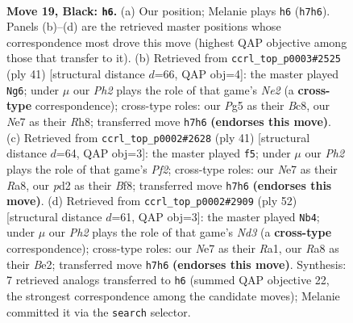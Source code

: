 \documentclass[11pt]{article}
\begin{document}
\clearpage

\begin{figure}[p]\centering
\begin{subfigure}{0.46\textwidth}\centering
\resizebox{\linewidth}{!}{%
\newchessgame
\chessboard[
  setfen={r1b3k1/ppppn2p/8/5pp1/8/1PN2P2/P1PPB1PP/R5K1 b - - 1 19},
  showmover=false,
  pgfstyle=straightmove, color=movearrow, markmove={h7-h6}
]}
\caption{}
\end{subfigure}\hfill
\begin{subfigure}{0.46\textwidth}\centering
\resizebox{\linewidth}{!}{%
\newchessgame
\chessboard[
  setfen={2b1k2r/ppp1np2/2p4p/4P3/7P/2N2N2/PPPR2P1/6K1 b - - 0 21},
  showmover=false,
  pgfstyle=straightmove, color=movearrow, markmove={e7-g6}
]}
\caption{}
\end{subfigure}
\\[4pt]
\begin{subfigure}{0.46\textwidth}\centering
\resizebox{\linewidth}{!}{%
\newchessgame
\chessboard[
  setfen={r3kb2/p1p2p2/1n4p1/2p4p/4N3/2B1P1P1/PP2KP1P/R7 b q - 0 21},
  showmover=false,
  pgfstyle=straightmove, color=movearrow, markmove={f7-f5}
]}
\caption{}
\end{subfigure}\hfill
\begin{subfigure}{0.46\textwidth}\centering
\resizebox{\linewidth}{!}{%
\newchessgame
\chessboard[
  setfen={1n2b3/1pr1kpp1/p3p2p/P7/2P5/1P1N1PP1/4B1P1/R5K1 w - - 3 27},
  showmover=false,
  pgfstyle=straightmove, color=movearrow, markmove={d3-b4}
]}
\caption{}
\end{subfigure}
\caption{\textbf{Move 19, Black: \texttt{h6}.} (a) Our position; Melanie plays \texttt{h6} (\texttt{h7h6}). Panels (b)--(d) are the retrieved master positions whose correspondence most drove this move (highest QAP objective among those that transfer to it). (b) Retrieved from \texttt{ccrl\_top\_p0003\#2525} (ply 41) [structural distance $d$=66, QAP obj=4]: the master played \texttt{Ng6}; under $\mu$ our \emph{Ph2} plays the role of that game's \emph{Ne2} (a \textbf{cross-type} correspondence); cross-type roles: our \emph{P}g5 as their \emph{B}c8, our \emph{N}e7 as their \emph{R}h8; transferred move \texttt{h7h6} \textbf{(endorses this move)}. (c) Retrieved from \texttt{ccrl\_top\_p0002\#2628} (ply 41) [structural distance $d$=64, QAP obj=3]: the master played \texttt{f5}; under $\mu$ our \emph{Ph2} plays the role of that game's \emph{Pf2}; cross-type roles: our \emph{N}e7 as their \emph{R}a8, our \emph{p}d2 as their \emph{B}f8; transferred move \texttt{h7h6} \textbf{(endorses this move)}. (d) Retrieved from \texttt{ccrl\_top\_p0002\#2909} (ply 52) [structural distance $d$=61, QAP obj=3]: the master played \texttt{Nb4}; under $\mu$ our \emph{Ph2} plays the role of that game's \emph{Nd3} (a \textbf{cross-type} correspondence); cross-type roles: our \emph{N}e7 as their \emph{R}a1, our \emph{R}a8 as their \emph{B}e2; transferred move \texttt{h7h6} \textbf{(endorses this move)}. Synthesis: 7 retrieved analogs transferred to \texttt{h6} (summed QAP objective 22, the strongest correspondence among the candidate moves); Melanie committed it via the \texttt{search} selector.}
\label{fig:thought-m37}
\end{figure}
\end{document}

